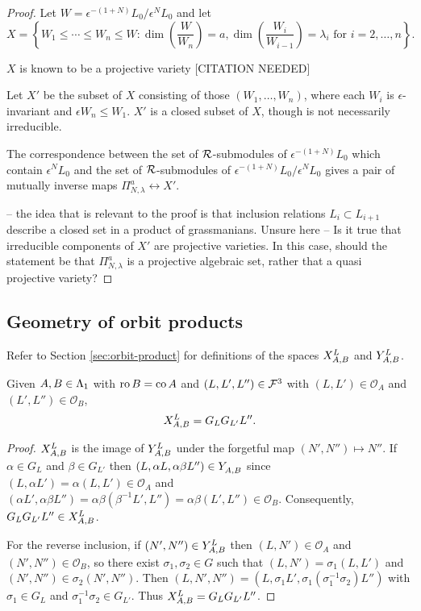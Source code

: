 \documentclass[a4paper, 11pt]{report}
\begin{document}
{\color{blue}
\begin{proof}
Let $W= \epsilon^{-(1+N)}L_0/{\epsilon^N L_0}$ and let
\begin{equation*}
X = \left\{W_1\le\cdots\le W_n\le W:\dim\left(\frac{W}{W_n}\right)=a, \dim\left(\frac{W_i}{W_{i-1}}\right) = \lambda_i \text{ for } i=2,\ldots,n\right\}.
\end{equation*}

$X$ is known to be a projective variety {\color{red}[CITATION NEEDED]}

Let $X'$ be the subset of $X$ consisting of those $(W_1,\ldots, W_n)$, where each $W_i$ is $\epsilon$-invariant and $\epsilon W_n \le W_1$. $X'$ is a closed subset of $X$, though is not necessarily irreducible.

The correspondence between the set of $\polys$-submodules of $\epsilon^{-(1+N)}L_0$ which contain $\epsilon^N L_0$ and the set of $\polys$-submodules of $\epsilon^{-(1+N)}L_0/{\epsilon^N L_0}$ gives a pair of mutually inverse maps $\Pi_{N,\lambda}^a\leftrightarrow X'$.

 -- the idea that is relevant to the proof is that inclusion relations $L_i\subset L_{i+1}$ describe a closed set in a product of grassmanians. Unsure here -- Is it true that irreducible components of $X'$ are projective varieties. In this case, should the statement be that $\Pi_{N,\lambda}^a$ is a projective algebraic set, rather that a quasi projective variety?
\end{proof}
}

\subsection{Geometry of orbit products}

Refer to Section \ref{sec:orbit-product} for definitions of the spaces $\xprod[L]{A,B}$ and $\yprod[L]{A,B}$.

\begin{lemma}
Given $A,B\in\matrices$ with $\ro{B}=\co{A}$ and $(L,L',L'')\in\flags^3$ with $(L,L')\in\mathcal{O}_A$ and $(L',L'')\in\mathcal{O}_B$,
\begin{equation*}
\xprod[L]{A,B} = G_L G_{L'} L''.
\end{equation*}
\end{lemma}

\begin{proof}
$\xprod[L]{A,B}$ is the image of $\yprod[L]{A,B}$ under the forgetful map $(N',N'')\mapsto N''$. If $\alpha\in G_L$ and $\beta\in G_{L'}$ then $(L,\alpha L,\alpha\beta L'')\in\yprod{A,B}$ since $(L,\alpha L')=\alpha(L,L')\in\mathcal{O}_A$ and $(\alpha L',\alpha\beta L'')=\alpha\beta(\beta^{-1}L',L'')=\alpha\beta(L',L'')\in\mathcal{O}_B$. Consequently, $G_L G_{L'}L''\in\xprod[L]{A,B}$.

For the reverse inclusion, if $(N',N'')\in\yprod[L]{A,B}$ then $(L,N')\in\mathcal{O}_A$ and $(N',N'')\in\mathcal{O}_B$, so there exist $\sigma_1,\sigma_2\in G$ such that $(L,N')=\sigma_1(L,L')$ and $(N',N'')\in\sigma_2(N',N'')$. Then $(L,N',N'') = (L,\sigma_1 L',\sigma_1(\sigma_1^{-1}\sigma_2) L'')$ with $\sigma_1\in G_L$ and $\sigma_1^{-1}\sigma_2\in G_{L'}$. Thus $\xprod[L]{A,B} = G_L G_{L'}L''$.
\end{proof}
\end{document}
